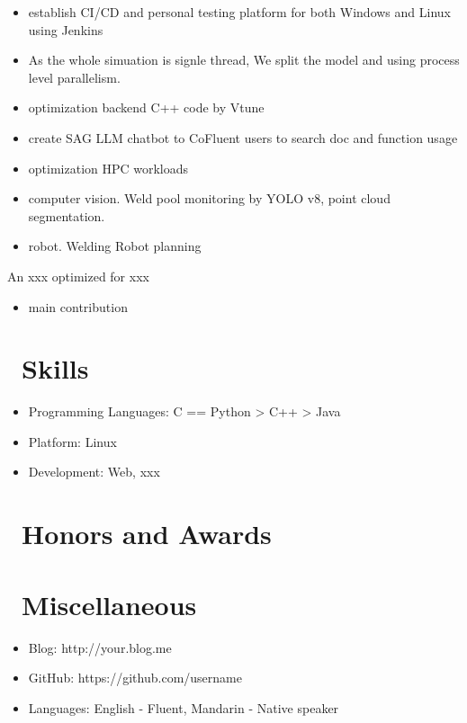 \documentclass{resume}
\begin{document}
\begin{itemize}
  \item  establish CI/CD and personal testing platform for both Windows and Linux using Jenkins
  \item As the whole simuation is signle thread, We split the model and using process level parallelism.
  \item optimization backend C++ code by Vtune
  \item create SAG LLM chatbot to CoFluent users to search doc and function usage
\end{itemize}

\begin{itemize}
  \item optimization HPC workloads 
  \item computer vision. Weld pool monitoring by YOLO v8, point cloud segmentation.
  \item robot. Welding Robot planning
\end{itemize}

An xxx optimized for xxx\cite{verma2015large}
\begin{itemize}
  \item main contribution
\end{itemize}

\section{\faCogs\ Skills}
\begin{itemize}[parsep=0.5ex]
  \item Programming Languages: C == Python > C++ > Java
  \item Platform: Linux
  \item Development: Web, xxx
\end{itemize}

\section{\faHeartO\ Honors and Awards}

\section{\faInfo\ Miscellaneous}
\begin{itemize}[parsep=0.5ex]
  \item Blog: http://your.blog.me
  \item GitHub: https://github.com/username
  \item Languages: English - Fluent, Mandarin - Native speaker
\end{itemize}

%
%
\end{document}

